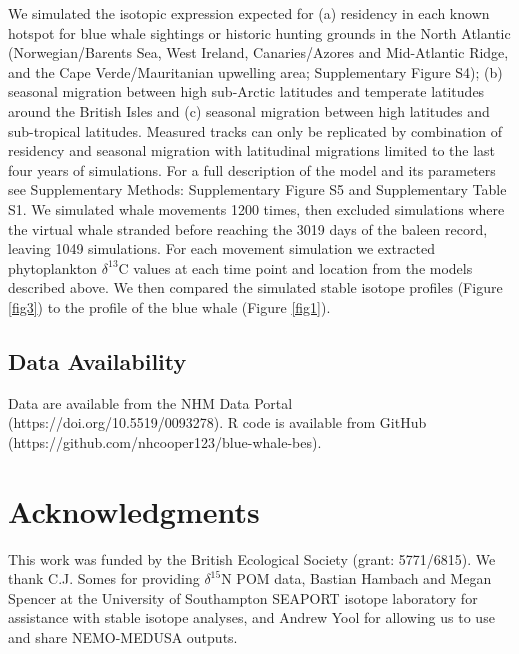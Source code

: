 \documentclass[a4paper,12pt]{article}
\begin{document}
We simulated the isotopic expression expected for (a) residency in each known hotspot for blue whale sightings or historic hunting grounds in the North Atlantic (Norwegian/Barents Sea, West Ireland, Canaries/Azores and Mid-Atlantic Ridge, and the Cape Verde/Mauritanian upwelling area\cite{mcdonald2006biogeographic,reilly2008balaenoptera,sigurjonsson1995life}; Supplementary Figure S4); (b) seasonal migration between high sub-Arctic latitudes and temperate latitudes around the British Isles and (c) seasonal migration between high latitudes and sub-tropical latitudes. 
Measured tracks can only be replicated by combination of residency and seasonal migration with latitudinal migrations limited to the last four years of simulations.
For a full description of the model and its parameters see Supplementary Methods: Supplementary Figure S5 and Supplementary Table S1. 
We simulated whale movements 1200 times, then excluded simulations where the virtual whale stranded before reaching the 3019 days of the baleen record, leaving 1049 simulations.
For each movement simulation we extracted phytoplankton $\delta^{13}$C values at each time point and location from the models described above\cite{magozzi2017using}. 
We then compared the simulated stable isotope profiles (Figure \ref{fig3}) to the profile of the blue whale (Figure \ref{fig1}).
 
\subsection{Data Availability}
Data are available from the NHM Data Portal (https://doi.org/10.5519/0093278). 
R code is available from GitHub (https://github.com/nhcooper123/blue-whale-bes).





\section{Acknowledgments}
This work was funded by the British Ecological Society (grant: 5771/6815). 
We thank C.J. Somes for providing  $\delta^{15}$N POM data, Bastian Hambach and Megan Spencer at the University of Southampton SEAPORT isotope laboratory for assistance with stable isotope analyses, and Andrew Yool for allowing us to use and share NEMO-MEDUSA outputs.
\end{document}
